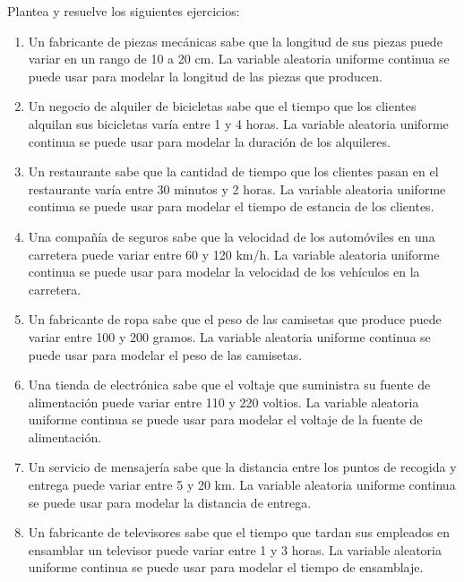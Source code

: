 \begin{Ejer}
Plantea y resuelve los siguientes ejercicios:

\begin{enumerate}
    \item Un fabricante de piezas mecánicas sabe que la longitud de sus piezas puede variar en un rango de 10 a 20 cm. La variable aleatoria uniforme continua se puede usar para modelar la longitud de las piezas que producen.

    \item Un negocio de alquiler de bicicletas sabe que el tiempo que los clientes alquilan sus bicicletas varía entre 1 y 4 horas. La variable aleatoria uniforme continua se puede usar para modelar la duración de los alquileres.

    \item Un restaurante sabe que la cantidad de tiempo que los clientes pasan en el restaurante varía entre 30 minutos y 2 horas. La variable aleatoria uniforme continua se puede usar para modelar el tiempo de estancia de los clientes.

    \item Una compañía de seguros sabe que la velocidad de los automóviles en una carretera puede variar entre 60 y 120 km/h. La variable aleatoria uniforme continua se puede usar para modelar la velocidad de los vehículos en la carretera.

    \item Un fabricante de ropa sabe que el peso de las camisetas que produce puede variar entre 100 y 200 gramos. La variable aleatoria uniforme continua se puede usar para modelar el peso de las camisetas.

    \item Una tienda de electrónica sabe que el voltaje que suministra su fuente de alimentación puede variar entre 110 y 220 voltios. La variable aleatoria uniforme continua se puede usar para modelar el voltaje de la fuente de alimentación.

    \item Un servicio de mensajería sabe que la distancia entre los puntos de recogida y entrega puede variar entre 5 y 20 km. La variable aleatoria uniforme continua se puede usar para modelar la distancia de entrega.

    \item Un fabricante de televisores sabe que el tiempo que tardan sus empleados en ensamblar un televisor puede variar entre 1 y 3 horas. La variable aleatoria uniforme continua se puede usar para modelar el tiempo de ensamblaje.


\end{enumerate}
\end{Ejer}
